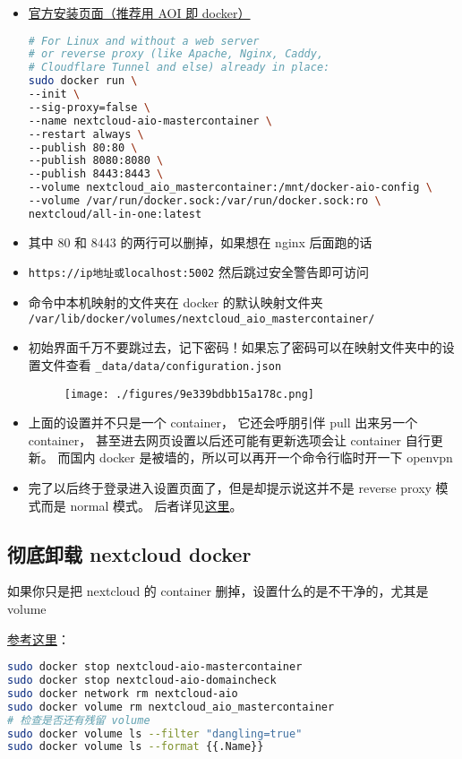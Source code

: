 
\begin{itemize}
\item \href{https://nextcloud.com/install/}{官方安装页面（推荐用 AOI 即 docker）}
\begin{lstlisting}[language=bash]
# For Linux and without a web server
# or reverse proxy (like Apache, Nginx, Caddy,
# Cloudflare Tunnel and else) already in place:
sudo docker run \
--init \
--sig-proxy=false \
--name nextcloud-aio-mastercontainer \
--restart always \
--publish 80:80 \
--publish 8080:8080 \
--publish 8443:8443 \
--volume nextcloud_aio_mastercontainer:/mnt/docker-aio-config \
--volume /var/run/docker.sock:/var/run/docker.sock:ro \
nextcloud/all-in-one:latest
\end{lstlisting}
\item 其中 80 和 8443 的两行可以删掉，如果想在 nginx 后面跑的话
\item \verb`https://ip地址或localhost:5002` 然后跳过安全警告即可访问
\item 命令中本机映射的文件夹在 docker 的默认映射文件夹 \verb`/var/lib/docker/volumes/nextcloud_aio_mastercontainer/`
\item 初始界面千万不要跳过去，记下密码！如果忘了密码可以在映射文件夹中的设置文件查看 \verb`_data/data/configuration.json`
\begin{figure}[ht]
\centering
\texttt{[image: ./figures/9e339bdbb15a178c.png]}
\caption{} \label{fig_nxclou_1}
\end{figure}
\item 上面的设置并不只是一个 container， 它还会呼朋引伴 pull 出来另一个 container， 甚至进去网页设置以后还可能有更新选项会让 container 自行更新。 而国内 docker 是被墙的，所以可以再开一个命令行临时开一下 openvpn
\item 完了以后终于登录进入设置页面了，但是却提示说这并不是 reverse proxy 模式而是 normal 模式。 后者详见\href{https://help.nextcloud.com/t/docker-aio-with-nginx-reverse-proxy-on-docker-network/173461}{这里}。
\end{itemize}

\subsection{彻底卸载 nextcloud docker}
如果你只是把 nextcloud 的 container 删掉，设置什么的是不干净的，尤其是 volume

\href{https://github.com/nextcloud/all-in-one#how-to-properly-reset-the-instance}{参考这里}：
\begin{lstlisting}[language=bash]
sudo docker stop nextcloud-aio-mastercontainer
sudo docker stop nextcloud-aio-domaincheck
sudo docker network rm nextcloud-aio
sudo docker volume rm nextcloud_aio_mastercontainer
# 检查是否还有残留 volume
sudo docker volume ls --filter "dangling=true"
sudo docker volume ls --format {{.Name}}
\end{lstlisting}
